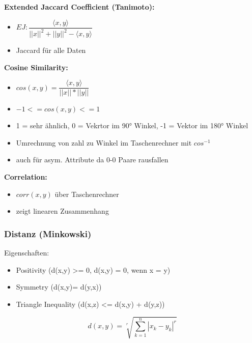\documentclass[a4paper]{article}
\begin{document}
\begin{landscape}
\begin{multicols}{3}
            \textbf{Extended Jaccard Coefficient (Tanimoto):}
            \begin{itemize}[noitemsep,nolistsep]
                \item $EJ: \dfrac{\langle x, y \rangle}{||x||^2 + ||y||^2 - \langle x,y \rangle}$
                \item Jaccard für alle Daten
            \end{itemize}

            \textbf{Cosine Similarity:}
            \begin{itemize}[noitemsep,nolistsep]
                \item $cos(x,y) =  \dfrac{\langle x, y \rangle}{||x|| * ||y||}$
                \item $ -1 <= cos(x,y) <= 1$
                \item 1 = sehr ähnlich, 0 = Vekrtor im 90° Winkel, -1 = Vektor im 180° Winkel
                \item Umrechnung von zahl zu Winkel im Taschenrechner mit $cos^{-1}$
                \item auch für asym. Attribute da 0-0 Paare rausfallen
            \end{itemize}

            \textbf{Correlation:}
            \begin{itemize}[noitemsep,nolistsep]
                \item $corr(x,y)$ über Taschenrechner
                \item zeigt linearen Zusammenhang
            \end{itemize}


            \subsubsection{Distanz (Minkowski)}

            Eigenschaften:
            \begin{itemize}[noitemsep,nolistsep]
                \item Positivity (d(x,y) >= 0, d(x,y) = 0, wenn x = y)
                \item Symmetry (d(x,y)= d(y,x))
                \item Triangle Inequality (d(x,z) <= d(x,y) + d(y,z))
            \end{itemize}
            
            $$ d(x,y) =  \sqrt[r]{\sum^{n}_{k=1} | x_k - y_k |^r} $$


\end{multicols}
\end{landscape}
\end{document}
